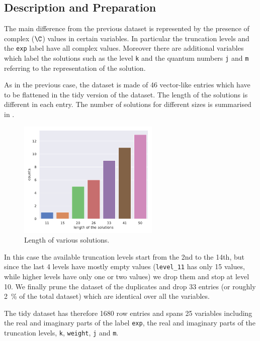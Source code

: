 \subsection{Description and Preparation}

The main difference from the previous dataset is represented by the presence of complex ($\C$) values in certain variables.
In particular the truncation levels and the \texttt{exp} label have all complex values.
Moreover there are additional variables which label the solutions such as the level \texttt{k} and the quantum numbers \texttt{j} and \texttt{m} referring to the  representation of the solution.

As in the previous case, the dataset is made of 46 vector-like entries which have to be flattened in the tidy version of the dataset.
The length of the solutions is different in each entry.
The number of solutions for different sizes is summarised in .

\begin{figure}[htbp]
  \centering
  \includegraphics[width=0.6\textwidth]{img/re_sol_length}
  \caption{Length of various solutions.}
  \label{fig:wzw:length}
\end{figure}

In this case the available truncation levels start from the 2nd to the 14th, but since the last 4 levels have mostly empty values (\texttt{level\_11} has only 15 values, while higher levels have only one or two values) we drop them and stop at level 10.
We finally prune the dataset of the duplicates and drop 33 entries (or roughly \SI{2}{\percent} of the total dataset) which are identical over all the variables.

The tidy dataset has therefore 1680 row entries and spans 25 variables including the real and imaginary parts of the label \texttt{exp}, the real and imaginary parts of the truncation levels, \texttt{k}, \texttt{weight}, \texttt{j} and \texttt{m}.


